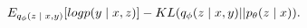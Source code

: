 \begin{equation}
E_{q_{\phi}(z \; | \;{x,y})}  [logp(y \; | \;{x, z} ) ] - KL (q_{\phi}(z \; | \;{x, y})|| p_{\theta}(z \; | \;{x})).
\end{equation}












